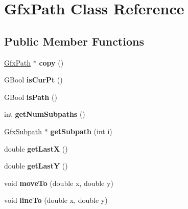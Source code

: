 \hypertarget{class_gfx_path}{}\section{Gfx\+Path Class Reference}
\label{class_gfx_path}
\subsection*{Public Member Functions}
\begin{DoxyCompactItemize}
\item 
\mbox{\label{class_gfx_path_a26e3361962acca883c6b54f68cf9adbe}} 
\hyperlink{class_gfx_path}{Gfx\+Path} $\ast$ {\bfseries copy} ()
\item 
\mbox{\label{class_gfx_path_aeb8b7b6542a6e51f8e83f1cc7b80bd47}} 
G\+Bool {\bfseries is\+Cur\+Pt} ()
\item 
\mbox{\label{class_gfx_path_aac37bca78e2bede7db6c70e203b3ea11}} 
G\+Bool {\bfseries is\+Path} ()
\item 
\mbox{\label{class_gfx_path_a9265f6ae1c7793d5367b25386bd33a42}} 
int {\bfseries get\+Num\+Subpaths} ()
\item 
\mbox{\label{class_gfx_path_a5b26849759df9974f5ec0bfd8b3d94cc}} 
\hyperlink{class_gfx_subpath}{Gfx\+Subpath} $\ast$ {\bfseries get\+Subpath} (int i)
\item 
\mbox{\label{class_gfx_path_a1a5e4c3c8142213c25180bc4b215441f}} 
double {\bfseries get\+LastX} ()
\item 
\mbox{\label{class_gfx_path_abdcf45928920d71e5f50b98b1676d804}} 
double {\bfseries get\+LastY} ()
\item 
\mbox{\label{class_gfx_path_accb00466ad59c2372406105d08064806}} 
void {\bfseries move\+To} (double x, double y)
\item 
\mbox{\label{class_gfx_path_a67cdb0140ccb3585b3d761669b510212}} 
void {\bfseries line\+To} (double x, double y)
\item 
\mbox{\label{class_gfx_path_a4a8051fe266fa571c482f5632623c79a}} 

\end{DoxyCompactItemize}
